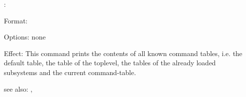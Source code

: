 \colab{} \tables:

Format: 

Options: none

Effect: This command prints the contents of all known command tables,
        i.e. the default table, the table of the \COLAB{} toplevel,
	the tables of the already loaded \COLAB{} subsystems and 
        the current command-table.

see also: \cmds, \?
